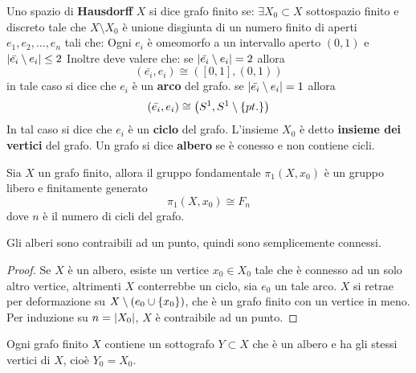 \documentclass[]{article}
\begin{document}
\begin{definition}  \nl
    Uno spazio di \textbf{Hausdorff} $X$ si dice grafo finito se: \nl
    $\exists X_0 \subset X$ sottospazio finito e discreto tale che $X \setminus X_0$ \`e
    unione disgiunta di un numero finito di aperti $e_1, e_2, \ldots, e_n$ tali che: \nl
    Ogni $e_i$ \`e omeomorfo a un intervallo aperto $(0, 1)$ e $\left| \bar{e_i} \setminus e_i \right| \leq 2$ \nl
    Inoltre deve valere che: \nl
    se $\left| \bar{e_i} \setminus e_i \right| = 2$ allora
        \[ 
            \left(\bar{e_i}, e_i\right) \cong \left([0,1], (0,1)\right)
        \]
    in tale caso si dice che $e_i$ \`e un \textbf{arco} del grafo. \nl
    se $\left| \bar{e_i} \setminus e_i \right| = 1$ allora
        \[
            \left(\bar{e_i}, e_i\right) \cong \left(S^{1}, S^{1} \setminus \left\{ pt. \right\}\right)
        \]
    In tal caso si dice che $e_i$ \`e un \textbf{ciclo} del grafo. \nl
    L'insieme $X_0$ \`e detto \textbf{insieme dei vertici} del grafo. \nl
    Un grafo si dice \textbf{albero} se \`e conesso e non contiene cicli.
\end{definition}

\begin{theorem}  \nl
    Sia $X$ un grafo finito, allora il gruppo fondamentale $\pi_1(X, x_0)$ \`e un gruppo libero e finitamente generato
    \[
        \pi_1(X, x_0) \cong F_n
    \]
    dove $n$ \`e il numero di cicli del grafo.
\end{theorem}

\begin{lemma} \nl
    Gli alberi sono contraibili ad un punto, quindi sono semplicemente connessi.
\end{lemma}

\begin{proof} \nl
    Se $X$ \`e un albero, esiste un vertice $x_0 \in X_0$ tale che \`e connesso ad un solo altro vertice,
    altrimenti $X$ conterrebbe un ciclo, sia $e_0$ un tale arco. \nl
    $X$ si retrae per deformazione su $X \setminus \left(e_0 \cup \left\{ x_0 \right\}\right)$, che \`e un grafo finito con un vertice in meno. \nl
    Per induzione su $n = \left| X_0 \right|$, $X$ \`e contraibile ad un punto.
\end{proof}

\begin{lemma} 
    Ogni grafo finito $X$ contiene un sottografo $Y \subset X$ che \`e un albero
    e ha gli stessi vertici di $X$, cio\`e $Y_0 = X_0$.
\end{lemma}
\end{document}
